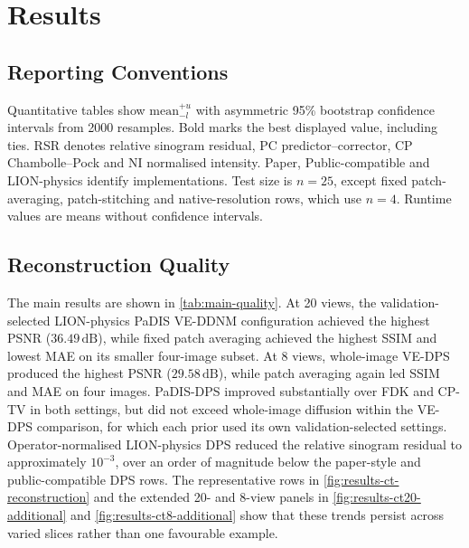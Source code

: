 \ifpdf
    \graphicspath{{Sections/4_results_figs/Raster/}{Sections/4_results_figs/PDF/}{Sections/4_results_figs/}}
\else
    \graphicspath{{Sections/4_results_figs/Vector/}{Sections/4_results_figs/}}
\fi

\chapter{Results}
\label{sec:results}

\section*{Reporting Conventions}
Quantitative tables show $\mathrm{mean}^{+u}_{-l}$ with asymmetric 95\% bootstrap confidence intervals from 2000 resamples. Bold marks the best displayed value, including ties. RSR denotes relative sinogram residual, PC predictor--corrector, CP Chambolle--Pock and NI normalised intensity. Paper, Public-compatible and LION-physics identify implementations. Test size is $n=25$, except fixed patch-averaging, patch-stitching and native-resolution rows, which use $n=4$. Runtime values are means without confidence intervals.

\section{Reconstruction Quality}

The main results are shown in \autoref{tab:main-quality}. At 20 views, the validation-selected LION-physics PaDIS VE-DDNM configuration achieved the highest PSNR ($36.49\,\mathrm{dB}$), while fixed patch averaging achieved the highest SSIM and lowest MAE on its smaller four-image subset. At 8 views, whole-image VE-DPS produced the highest PSNR ($29.58\,\mathrm{dB}$), while patch averaging again led SSIM and MAE on four images. PaDIS-DPS improved substantially over FDK and CP-TV in both settings, but did not exceed whole-image diffusion within the VE-DPS comparison, for which each prior used its own validation-selected settings. Operator-normalised LION-physics DPS reduced the relative sinogram residual to approximately $10^{-3}$, over an order of magnitude below the paper-style and public-compatible DPS rows. The representative rows in \autoref{fig:results-ct-reconstruction} and the extended 20- and 8-view panels in \autoref{fig:results-ct20-additional} and \autoref{fig:results-ct8-additional} show that these trends persist across varied slices rather than one favourable example.

